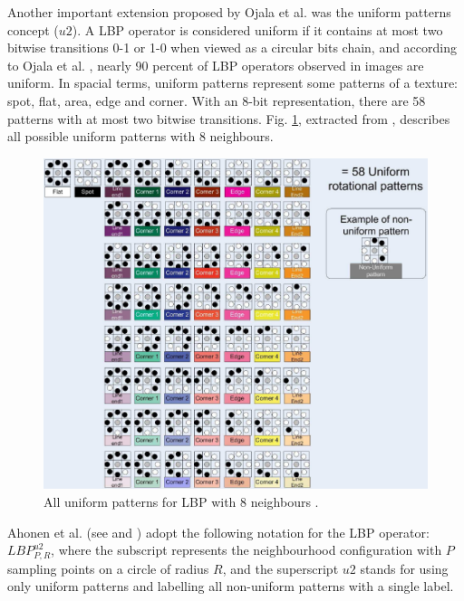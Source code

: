 \begin{appendices}
Another important extension proposed by Ojala et al. \cite{ojala2002multiresolution} was the uniform patterns concept ($u2$). A LBP operator is considered uniform if it contains at most two bitwise transitions 0-1 or 1-0 when viewed as a circular bits chain, and according to Ojala et al. \cite{ojala2002multiresolution}, nearly 90 percent of LBP operators observed in images are uniform. In spacial terms, uniform patterns represent some patterns of a texture: spot, flat, area, edge and corner. With an 8-bit representation, there are 58 patterns with at most two bitwise transitions. Fig. \ref{fig_uniformPattern}, extracted from \cite{Chan2008}, describes all possible uniform patterns with 8 neighbours.

\begin{figure}
\begin{center}
\includegraphics [width=12cm] {images/fig_uniformPattern} 
\end{center}
   \caption[All uniform patterns for LBP with 8 neighbours]{All uniform patterns for LBP with 8 neighbours \cite{Chan2008}.}   
\label{fig_uniformPattern}
\end{figure}

Ahonen et al. (see \cite{ahonen2004face} and \cite{ahonen2006face}) adopt the following notation for the LBP operator: $LBP_{P,R}^{u2}$, where the subscript represents the neighbourhood configuration with $P$ sampling points on a circle of radius $R$, and the superscript $u2$ stands for using only uniform patterns and labelling all non-uniform patterns with a single label.


\end{appendices}
